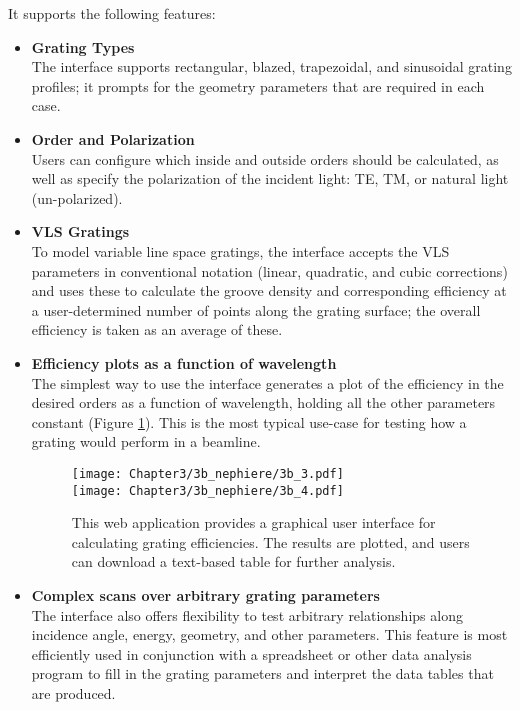 It supports the following features:
\begin{itemize}
\item \textbf{Grating Types}\\
The interface supports rectangular, blazed, trapezoidal, and sinusoidal grating profiles; it prompts for the geometry parameters that are required in each case.

\item \textbf{Order and Polarization}\\
Users can configure which inside and outside orders should be calculated, as well as specify the polarization of the incident light: TE, TM, or natural light (un-polarized).

\item \textbf{VLS Gratings}\\
To model variable line space gratings, the interface accepts the VLS parameters in conventional notation (linear, quadratic, and cubic corrections) and uses these to calculate the groove density and corresponding efficiency at a user-determined number of points along the grating surface; the overall efficiency is taken as an average of these.

\item \textbf{Efficiency plots as a function of wavelength}\\
The simplest way to use the interface generates a plot of the efficiency in the desired orders as a function of wavelength, holding all the other parameters constant (Figure \ref{3b_3}).  This is the most typical use-case for testing how a grating would perform in a beamline.

\begin{figure}[p] %
   \centering
   \vspace*{-.5in}
   \texttt{[image: Chapter3/3b\_nephiere/3b\_3.pdf]} \\
   \texttt{[image: Chapter3/3b\_nephiere/3b\_4.pdf]}
   \caption{This web application provides a graphical user interface for calculating grating efficiencies. The results are plotted, and users can download a text-based table for further analysis.}
   \label{3b_3}
\end{figure}

\item \textbf{Complex scans over arbitrary grating parameters}\\
The interface also offers flexibility to test arbitrary relationships along incidence angle, energy, geometry, and other parameters. This feature is most efficiently used in conjunction with a spreadsheet or other data analysis program to fill in the grating parameters and interpret the data tables that are produced.


\end{itemize}
